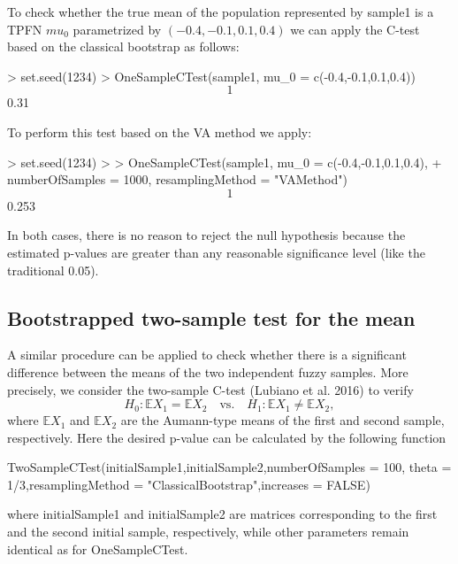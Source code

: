 To check whether the true mean of the population represented by sample1
is a TPFN \(mu_0\) parametrized by \((-0.4,-0.1,0.1,0.4)\) we can apply the
C-test based on the classical bootstrap as follows:

\begin{example}
\textgreater{} set.seed(1234) \textgreater{} OneSampleCTest(sample1, mu\_0 =
c(-0.4,-0.1,0.1,0.4)) \[1\] 0.31
\end{example}

To perform this test based on the VA method we apply:

\begin{example}
\textgreater{} set.seed(1234) \textgreater{} \textgreater{} OneSampleCTest(sample1, mu\_0 =
c(-0.4,-0.1,0.1,0.4), + numberOfSamples = 1000, resamplingMethod =
"VAMethod") \[1\] 0.253
\end{example}

In both cases, there is no reason to reject the null hypothesis because
the estimated p-values are greater than any reasonable significance
level (like the traditional 0.05).

\hypertarget{bootstrapped-two-sample-test-for-the-mean}{%
\subsection{Bootstrapped two-sample test for the mean}\label{bootstrapped-two-sample-test-for-the-mean}}

A similar procedure can be applied to check whether there is a
significant difference between the means of the two independent fuzzy
samples. More precisely, we consider the two-sample C-test
(Lubiano et al. 2016) to verify \[\label{h0ctestc2}
    H_0 : \mathbb{E} X_1 = \mathbb{E} X_2 \quad\text{vs.}\quad H_1 : \mathbb{E} X_1 \not = \mathbb{E} X_2 ,\]
where \(\mathbb{E} X_1\) and \(\mathbb{E} X_2\) are the Aumann-type means of
the first and second sample, respectively. Here the desired p-value can
be calculated by the following function

\begin{example}
TwoSampleCTest(initialSample1,initialSample2,numberOfSamples = 100,
theta = 1/3,resamplingMethod = "ClassicalBootstrap",increases = FALSE)
\end{example}

where initialSample1 and initialSample2 are matrices corresponding to
the first and the second initial sample, respectively, while other
parameters remain identical as for OneSampleCTest.

